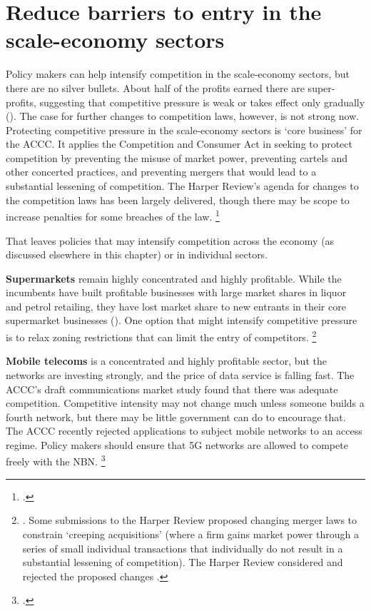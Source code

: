 \section{Reduce barriers to entry in the scale-economy sectors}
Policy makers can help intensify competition in the scale-economy sectors, but there are no silver bullets. About half of the profits earned there are super-profits, suggesting that competitive pressure is weak or takes effect only gradually ().
The case for further changes to competition laws, however, is not strong now.
Protecting competitive pressure in the scale-economy sectors is `core business' for the ACCC\@.
It applies the Competition and Consumer Act in seeking to protect competition by preventing the misuse of market power, preventing cartels and other concerted practices, and preventing mergers that would lead to a substantial lessening of competition. The Harper Review's agenda for changes to the competition laws has been largely delivered, though there may be scope to increase penalties for some breaches of the law.%
\footcites{Harper2015Competition}{Morrison2017Competition}{Caronpenalties2017}

That leaves policies that may intensify competition across the economy (as discussed elsewhere in this chapter) or in individual sectors.%

\textbf{Supermarkets} remain highly concentrated and highly profitable. While the incumbents have built profitable businesses with large market shares in liquor and petrol retailing, they have lost market share to new entrants in their core supermarket businesses (). One option that might intensify competitive pressure is to relax zoning restrictions that can limit the entry of competitors.%
\footnote{\textcites{ACCC-grocery-2008}{PC-retail-2011}. Some submissions to the Harper Review proposed changing merger laws to constrain `creeping acquisitions' (where a firm gains market power through a series of small individual transactions that individually do not result in a substantial lessening of competition). The Harper Review considered and rejected the proposed changes \parencite{Harper2015Competition}.}

\CenturyFootnote

\textbf{Mobile telecoms} is a concentrated and highly profitable sector, but the networks are investing strongly, and the price of data service is falling fast. The ACCC's draft communications market study found that there was adequate competition. Competitive intensity may not change much unless someone builds a fourth network, but there may be little government can do to encourage that. The ACCC recently rejected applications to subject mobile networks to an access regime. Policy makers should ensure that 5G networks are allowed to compete freely with the NBN.%
\footcites{ACCCCommsMarketStudyDraft2017}{ACCC-mobile-services}

